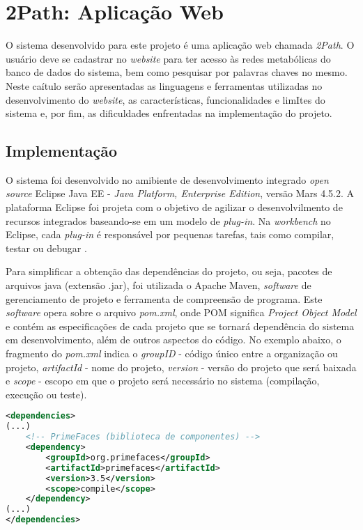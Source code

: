 \chapter{2Path: Aplicação Web}

\indent O sistema desenvolvido para este projeto é uma aplicação web chamada \textit{2Path}. O usuário deve se cadastrar no \textit{website} para ter acesso às redes metabólicas do banco de dados do sistema, bem como pesquisar por palavras chaves no mesmo. Neste caítulo serão apresentadas as linguagens e ferramentas utilizadas no desenvolvimento do \textit{website}, as características, funcionalidades e limItes do sistema e, por fim, as dificuldades enfrentadas na implementação do projeto.

\section{Implementação}

\indent O sistema foi desenvolvido no amibiente de desenvolvimento integrado \textit{open source} Eclipse Java EE - \textit{Java Platform, Enterprise Edition}, versão Mars 4.5.2. A plataforma Eclipse foi projeta com o objetivo de agilizar o desenvolvilmento de recursos integrados baseando-se em um modelo de \textit{plug-in}. Na \textit{workbench} no Eclipse, cada \textit{plug-in} é responsável por pequenas tarefas, tais como compilar, testar ou debugar \cite{eclipseDoc}.

\indent Para simplificar a obtenção das dependências do projeto, ou seja, pacotes de arquivos java (extensão .jar), foi utilizada o Apache Maven, \textit{software} de gerenciamento de projeto e ferramenta de compreensão de programa. Este \textit{software} opera sobre o arquivo \textit{pom.xml}, onde POM significa \textit{Project Object Model} e contém as especificações de cada projeto que se tornará dependência do sistema em desenvolvimento, além de outros aspectos do código. No exemplo abaixo, o fragmento do \textit{pom.xml} indica o \textit{groupID} - código único entre a organização ou projeto, \textit{artifactId} - nome do projeto, \textit{version} - versão do projeto que será baixada e \textit{scope} - escopo em que o projeto será necessário no sistema (compilação, execução ou teste).

\begin{lstlisting}[language=XML]
<dependencies>
(...)
	<!-- PrimeFaces (biblioteca de componentes) -->
	<dependency>
		<groupId>org.primefaces</groupId>
		<artifactId>primefaces</artifactId>
		<version>3.5</version>
		<scope>compile</scope>
	</dependency>
(...)
</dependencies>
\end{lstlisting}

